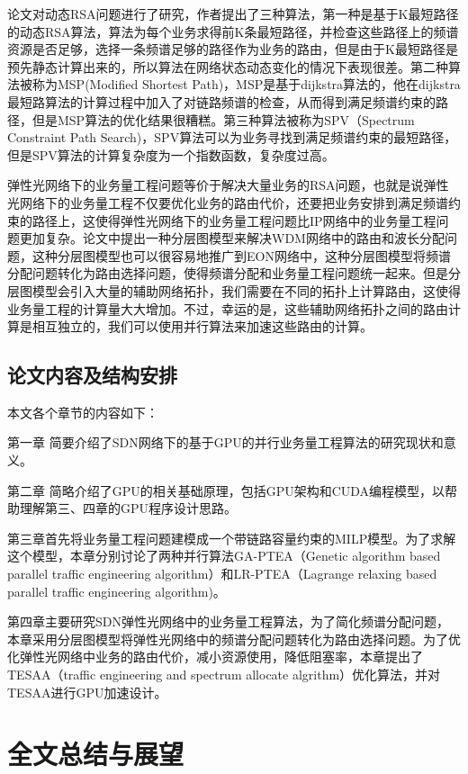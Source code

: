 \documentclass[master]{thesis-uestc}
\begin{document}
论文对动态RSA问题进行了研究，作者提出了三种算法，第一种是基于K最短路径的动态RSA算法，算法为每个业务求得前K条最短路径，并检查这些路径上的频谱资源是否足够，选择一条频谱足够的路径作为业务的路由，但是由于K最短路径是预先静态计算出来的，所以算法在网络状态动态变化的情况下表现很差。第二种算法被称为MSP(Modified Shortest Path)，MSP是基于dijkstra算法的，他在dijkstra最短路算法的计算过程中加入了对链路频谱的检查，从而得到满足频谱约束的路径，但是MSP算法的优化结果很糟糕。第三种算法被称为SPV（Spectrum Constraint Path Search)，SPV算法可以为业务寻找到满足频谱约束的最短路径，但是SPV算法的计算复杂度为一个指数函数，复杂度过高。

弹性光网络下的业务量工程问题等价于解决大量业务的RSA问题，也就是说弹性光网络下的业务量工程不仅要优化业务的路由代价，还要把业务安排到满足频谱约束的路径上，这使得弹性光网络下的业务量工程问题比IP网络中的业务量工程问题更加复杂。论文中提出一种分层图模型来解决WDM网络中的路由和波长分配问题，这种分层图模型也可以很容易地推广到EON网络中，这种分层图模型将频谱分配问题转化为路由选择问题，使得频谱分配和业务量工程问题统一起来。但是分层图模型会引入大量的辅助网络拓扑，我们需要在不同的拓扑上计算路由，这使得业务量工程的计算量大大增加。不过，幸运的是，这些辅助网络拓扑之间的路由计算是相互独立的，我们可以使用并行算法来加速这些路由的计算。

\section{论文内容及结构安排}
本文各个章节的内容如下：

第一章 简要介绍了SDN网络下的基于GPU的并行业务量工程算法的研究现状和意义。

第二章 简略介绍了GPU的相关基础原理，包括GPU架构和CUDA编程模型，以帮助理解第三、四章的GPU程序设计思路。

第三章首先将业务量工程问题建模成一个带链路容量约束的MILP模型。为了求解这个模型，本章分别讨论了两种并行算法GA-PTEA（Genetic algorithm based parallel traffic engineering algorithm）和LR-PTEA（Lagrange relaxing based parallel traffic engineering algorithm)。

第四章主要研究SDN弹性光网络中的业务量工程算法，为了简化频谱分配问题，本章采用分层图模型将弹性光网络中的频谱分配问题转化为路由选择问题。为了优化弹性光网络中业务的路由代价，减小资源使用，降低阻塞率，本章提出了TESAA（traffic engineering and spectrum allocate algrithm）优化算法，并对TESAA进行GPU加速设计。




\chapter{全文总结与展望}
\end{document}
